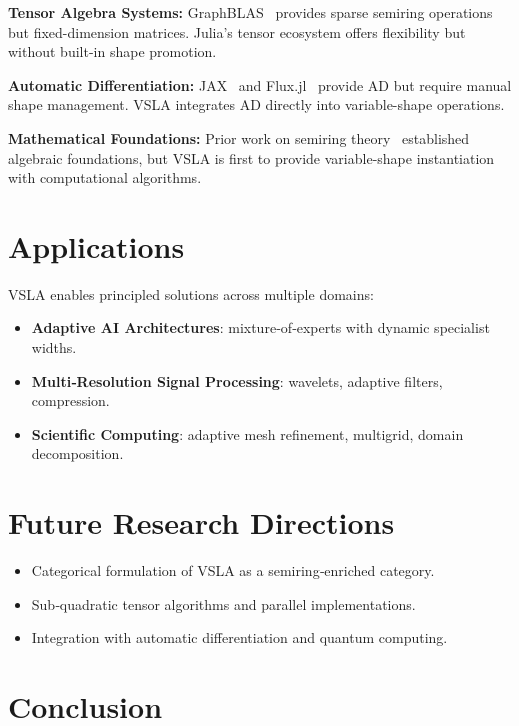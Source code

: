 \documentclass[sigconf,review]{acmart}
\begin{document}
\textbf{Tensor Algebra Systems:} GraphBLAS~\cite{GraphBLAS2019} provides sparse semiring operations but fixed-dimension matrices. Julia's tensor ecosystem offers flexibility but without built-in shape promotion.

\textbf{Automatic Differentiation:} JAX~\cite{JAX2020} and Flux.jl~\cite{Innes2019} provide AD but require manual shape management. VSLA integrates AD directly into variable-shape operations.

\textbf{Mathematical Foundations:} Prior work on semiring theory~\cite{Golan99} established algebraic foundations, but VSLA is first to provide variable-shape instantiation with computational algorithms.

\section{Applications}

VSLA enables principled solutions across multiple domains:

\begin{itemize}[leftmargin=1.5em]
  \item \textbf{Adaptive AI Architectures}: mixture‑of‑experts with dynamic specialist widths.
  \item \textbf{Multi‑Resolution Signal Processing}: wavelets, adaptive filters, compression.
  \item \textbf{Scientific Computing}: adaptive mesh refinement, multigrid, domain decomposition.
\end{itemize}

\section{Future Research Directions}

\begin{itemize}[leftmargin=1.5em]
  \item Categorical formulation of VSLA as a semiring‑enriched category.
  \item Sub‑quadratic tensor algorithms and parallel implementations.
  \item Integration with automatic differentiation and quantum computing.
\end{itemize}

\section{Conclusion}
\end{document}
